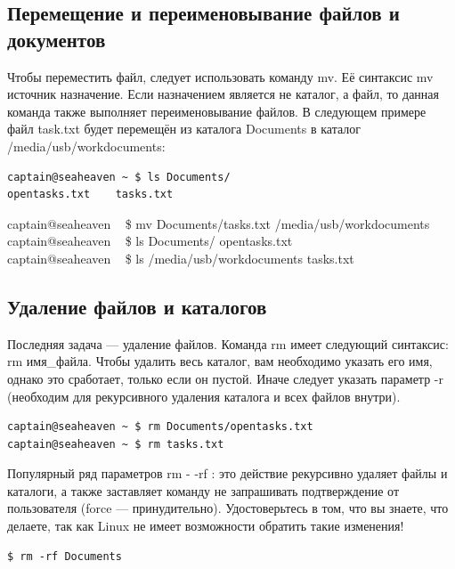 \documentclass[10pt]{book}
\begin{document}
\subsection{Перемещение и переименовывание файлов и документов}
Чтобы переместить файл, следует использовать команду mv. Её синтаксис mv источник назначение. Если назначением является не каталог, а файл, то данная команда также выполняет переименовывание файлов. В следующем примере файл task.txt будет перемещён из каталога Documents в каталог /media/usb/workdocuments:

\vspace{3mm}
\begin{tcolorbox}
\begin{lstlisting}
captain@seaheaven ~ $ ls Documents/
opentasks.txt	 tasks.txt
\end{lstlisting}
captain@seaheaven ~ \$ mv Documents/tasks.txt /media/usb/workdocuments \\
captain@seaheaven ~ \$ ls Documents/
opentasks.txt \\
captain@seaheaven ~ \$ ls /media/usb/workdocuments
tasks.txt
\end{tcolorbox}

\subsection{Удаление файлов и каталогов}

Последняя задача — удаление файлов. Команда rm имеет следующий синтаксис: rm имя\_файла. Чтобы удалить весь каталог, вам необходимо указать его имя, однако это сработает, только если он пустой. Иначе следует указать параметр -r  (необходим для рекурсивного удаления каталога и всех файлов внутри).

\vspace{3mm}
\begin{tcolorbox}
\begin{lstlisting}
captain@seaheaven ~ $ rm Documents/opentasks.txt
captain@seaheaven ~ $ rm tasks.txt
\end{lstlisting}
\end{tcolorbox}

Популярный ряд параметров rm - -rf : это действие рекурсивно удаляет файлы и каталоги, а также заставляет команду не запрашивать подтверждение от пользователя (force — принудительно). Удостоверьтесь в том, что вы знаете, что делаете, так как Linux не имеет возможности обратить такие изменения! 

\vspace{3mm}
\begin{tcolorbox}
\begin{lstlisting}
$ rm -rf Documents
\end{lstlisting}
\end{tcolorbox}
\end{document}

